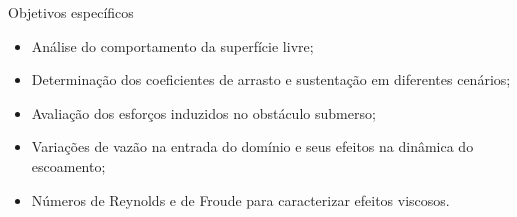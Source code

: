 \begin{frame}{Objetivos específicos}
    \begin{itemize}
        \large
        \item Análise do comportamento da superfície livre;
        \item Determinação dos coeficientes de arrasto e sustentação em diferentes cenários;
        \item Avaliação dos esforços induzidos no obstáculo submerso;
        \item Variações de vazão na entrada do domínio e seus efeitos na dinâmica do escoamento;
        \item Números de Reynolds e de Froude para caracterizar efeitos viscosos.
    \end{itemize}
\end{frame}